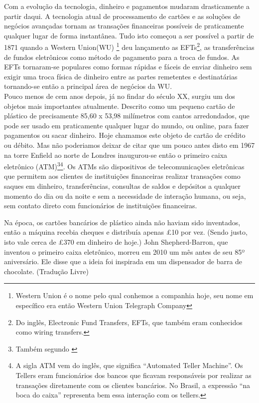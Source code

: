 Com a evolução da tecnologia, dinheiro e pagamentos mudaram drasticamente a partir daqui. A tecnologia atual de processamento de cartões e as soluções de negócios avançadas tornam as transações financeiras possíveis de praticamente qualquer lugar de forma instantânea.  Tudo isto começou a ser possível a partir de 1871 quando a Western Union(WU) \footnote{Western Union é o nome pelo qual conhemos a companhia hoje, seu nome em específico era então Western Union Telegraph Company} deu lançamento as EFTs\footnote{Do inglês, Electronic Fund Transfers, EFTs, que também eram conhecidos como wiring transfers.}, as transferências de fundos eletrônicos como método de pagamento para a troca de fundos. As EFTs tornaram-se populares como formas rápidas e fáceis de enviar dinheiro sem exigir uma troca física de dinheiro entre as partes remetentes e destinatárias tornando-se então a principal área de negócios da WU.\\
Pouco menos de cem anos depois, já no findar do século XX, surgiu  um dos objetos mais importantes atualmente. Descrito como um pequeno cartão de plástico de precisamente 85,60 x 53,98 milímetros com cantos arredondados, que pode ser usado em praticamente qualquer lugar do mundo, ou online, para fazer pagamentos ou sacar dinheiro. Hoje chamamos este objeto de cartão de crédito ou débito. 
Mas não poderiamos deixar de citar que um pouco antes disto em 1967 na torre Enfield ao norte de Londres inaugurou-se então o primeiro caixa eletrônico (ATM)\footnote{Também segundo \cite{QUARTZ}}\footnote{A sigla ATM vem do inglês, que significa ``Automated Teller Machine''. Os Tellers eram funcionários dos bancos que ficavam responsáveis por realizar as transações diretamente com os clientes bancários. No Brasil, a expressão ``na boca do caixa'' representa bem essa interação com os tellers.}. Os ATMs são dispositivos de telecomunicações eletrônicas que permitem aos clientes de instituições financeiras realizar transações como saques em dinheiro, transferências, consultas de saldos e depósitos a qualquer momento do dia ou da noite e sem a necessidade de interação humana, ou seja, sem contato direto com funcionários de instituições financeiras.

\begin{citacao}
	Na época, os cartões bancários de plástico ainda não haviam sido inventados, então a máquina recebia cheques e distribuía apenas \pounds10 por vez. (Sendo justo, isto vale cerca de \pounds370 em dinheiro de hoje.) John Shepherd-Barron, que inventou o primeiro caixa eletrônico, morreu em 2010 um mês antes de seu 85º aniversário. Ele disse que a ideia foi inspirada em um dispensador de barra de chocolate. (Tradução Livre) \cite{QUARTZ}
\end{citacao}

